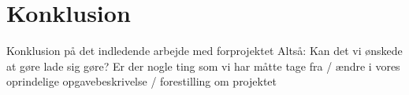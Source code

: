 \chapter{Konklusion}
Konklusion på det indledende arbejde med forprojektet
Altså:
Kan det vi ønskede at gøre lade sig gøre? Er der nogle ting som vi har måtte tage fra / ændre i vores oprindelige opgavebeskrivelse / forestilling om projektet
